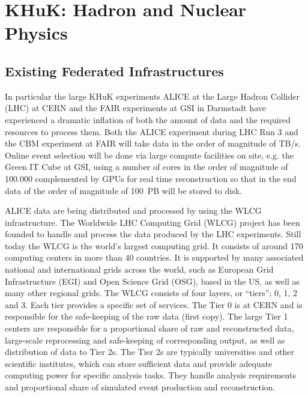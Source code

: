 \section{KHuK: Hadron and Nuclear Physics}


\subsection{Existing Federated Infrastructures}
In particular the large KHuK experiments ALICE at the Large Hadron Collider (LHC) at CERN
and the FAIR experiments at GSI in Darmstadt have experienced a dramatic inflation of both the amount of
data and the required resources to process them. 
Both the ALICE experiment during LHC Run 3 and the CBM experiment at FAIR will take data in the order of magnitude of TB/s.
Online event selection will be done via large compute facilities on site, e.g. the Green IT Cube at GSI,
using a number of cores in the order of magnitude of 100.000 complemented by GPUs for real time reconstruction
so that in the end data of the order of magnitude of 100~PB  will be stored to disk.

ALICE data are being distributed and processed by using the WLCG infrastructure. 
The Worldwide LHC Computing Grid (WLCG) project has
been founded to handle and process the data produced by the LHC
experiments. Still today  the WLCG is the world's largest computing
grid. It consists of around 170 computing centers in more than 40
countries.  It is supported by many associated national and
international grids across the world, such as European Grid
Infrastructure (EGI) and Open Science Grid (OSG), based in the US, as well as many other
regional grids.  The WLCG consists of four layers, or ``tiers''; 0, 1, 2
and 3. Each tier provides a specific set of services. The Tier 0 is at
CERN and is responsible for the safe-keeping of the raw data (first
copy). The large Tier 1 centers are responsible for a proportional
share of raw and reconstructed data, large-scale reprocessing and
safe-keeping of corresponding output, as well as distribution of data to Tier
2s. The Tier 2s are typically universities and other scientific
institutes, which can store sufficient data and provide adequate
computing power for specific analysis tasks. They handle analysis
requirements and proportional share of simulated event production and
reconstruction.



